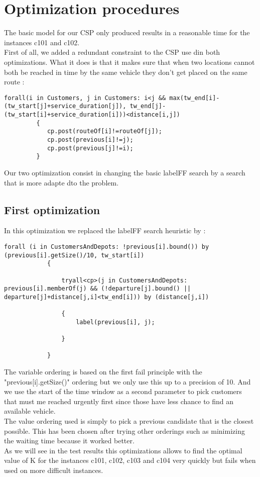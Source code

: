 \documentclass{eplDoc}
\begin{document}
\section{Optimization procedures}
The basic model for our CSP only produced results in a reasonable time for the instances c101 and c102. \\ 
First of all, we added a redundant constraint to the CSP use din both optimizations. What it does is that it makes sure that when two locations cannot both be reached in time by the same vehicle they don't get placed on the same route :  
\begin{lstlisting}
forall(i in Customers, j in Customers: i<j && max(tw_end[i]-(tw_start[j]+service_duration[j]), tw_end[j]-(tw_start[i]+service_duration[i]))<distance[i,j])
         {
            cp.post(routeOf[i]!=routeOf[j]);
            cp.post(previous[i]!=j);
            cp.post(previous[j]!=i);
         }
\end{lstlisting}

Our two optimization consist in changing the basic labelFF search by a search that is more adapte dto the problem. 
\subsection{First optimization}

In this optimization we replaced the labelFF search heuristic by : 
\begin{lstlisting}
forall (i in CustomersAndDepots: !previous[i].bound()) by (previous[i].getSize()/10, tw_start[i])
            {
               
                tryall<cp>(j in CustomersAndDepots: previous[i].memberOf(j) && (!departure[j].bound() || departure[j]+distance[j,i]<tw_end[i])) by (distance[j,i])

                {
                    label(previous[i], j);
                    
                } 
                
            }
\end{lstlisting}

The variable ordering is based on the first fail principle with the "previous[i].getSize()" ordering but we only use this up to a precision of 10. And we use the start of the time window as a second parameter to pick customers that must me reached urgently first since those have less chance to find an available vehicle. \\ 
The value ordering used is simply to pick a previous candidate that is the closest possible. This has been chosen after trying other orderings such as minimizing the waiting time because it worked better. \\ 
As we will see in the test results this optimizations allows to find the optimal value of K for the instances c101, c102, c103 and c104 very quickly but fails when used on more difficult instances.
\end{document}
